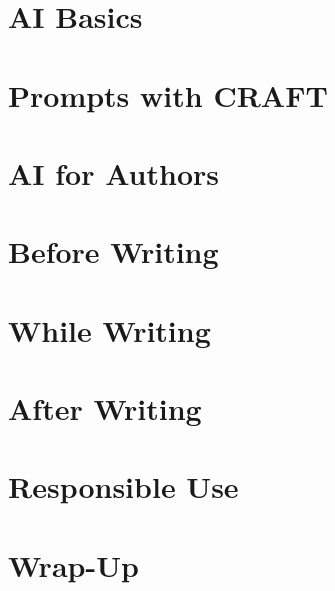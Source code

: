 
\section[Core]{AI Basics}



\section[Prompts]{Prompts with CRAFT}


\section[Authors]{AI for Authors}


\section[Before]{Before Writing}


\section[During]{While Writing}


\section[After]{After Writing}


\section[Responsible]{Responsible Use}


\section[WrapUp]{Wrap-Up}

